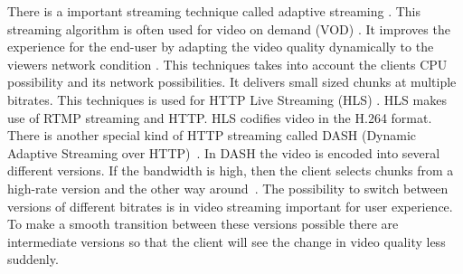 \documentclass{sig-alternate-br}
\begin{document}
There is a important streaming technique called adaptive streaming \cite{computer-networking}. This streaming algorithm is often used for video on demand (VOD) \cite{computer-networking}. It improves the experience for the end-user by adapting the video quality dynamically to the viewers network condition \cite{ffmpeg}. This techniques takes into account the clients CPU possibility and its network possibilities. It delivers small sized chunks at multiple bitrates. This techniques is used for HTTP Live Streaming (HLS) \cite{jwplayer}. HLS makes use of RTMP streaming and HTTP. HLS codifies video in the H.264 format.\newline
There is another special kind of HTTP streaming called DASH (Dynamic Adaptive Streaming over HTTP)~\cite{computer-networking}. In DASH the video is encoded into several different versions. If the bandwidth is high, then the client selects chunks from a high-rate version and the other way around~\cite{computer-networking}. The possibility to switch between versions of different bitrates is in video streaming important for user experience. To make a smooth transition between these versions possible there are intermediate versions so that the client will see the change in video quality less suddenly. 
\end{document}
